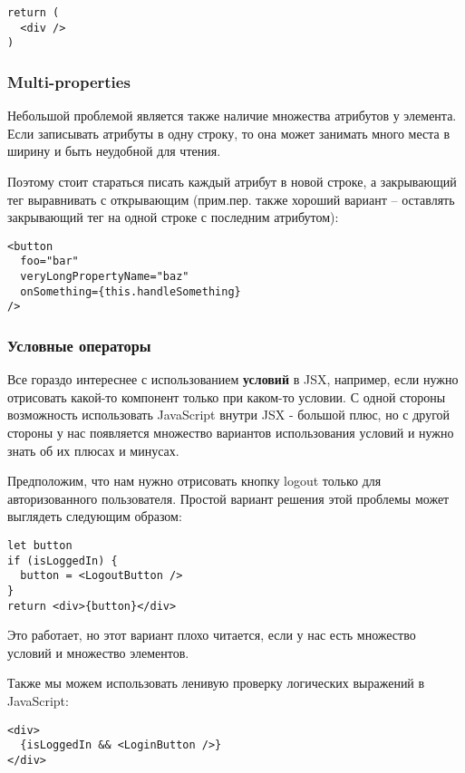 \begin{lstlisting}
return (
  <div />
)
\end{lstlisting}

\subsubsection{Multi-properties}

Небольшой проблемой является также наличие множества атрибутов у элемента. Если записывать атрибуты в одну строку, то она может занимать много места в ширину и быть неудобной для чтения. 

Поэтому стоит стараться писать каждый атрибут в новой строке, а закрывающий тег выравнивать с открывающим (прим.пер. также хороший вариант -- оставлять закрывающий тег на одной строке с последним атрибутом):

\begin{lstlisting}
<button
  foo="bar"
  veryLongPropertyName="baz"
  onSomething={this.handleSomething}
/>
\end{lstlisting}

\subsubsection{Условные операторы}

Все гораздо интереснее с использованием \textbf{условий} в JSX, например, если нужно отрисовать какой-то компонент только при каком-то условии. С одной стороны возможность использовать JavaScript внутри JSX - большой плюс, но с другой стороны у нас появляется множество вариантов использования условий и нужно знать об их плюсах и минусах.

Предположим, что нам нужно отрисовать кнопку logout только для авторизованного пользователя. Простой вариант решения этой проблемы может выглядеть следующим образом:

\begin{lstlisting}
let button
if (isLoggedIn) {
  button = <LogoutButton />
}
return <div>{button}</div>
\end{lstlisting}
   
Это работает, но этот вариант плохо читается, если у нас есть множество условий и множество элементов.

Также мы можем использовать ленивую проверку логических выражений в JavaScript:

\begin{lstlisting}
<div>
  {isLoggedIn && <LoginButton />}
</div>
\end{lstlisting}

